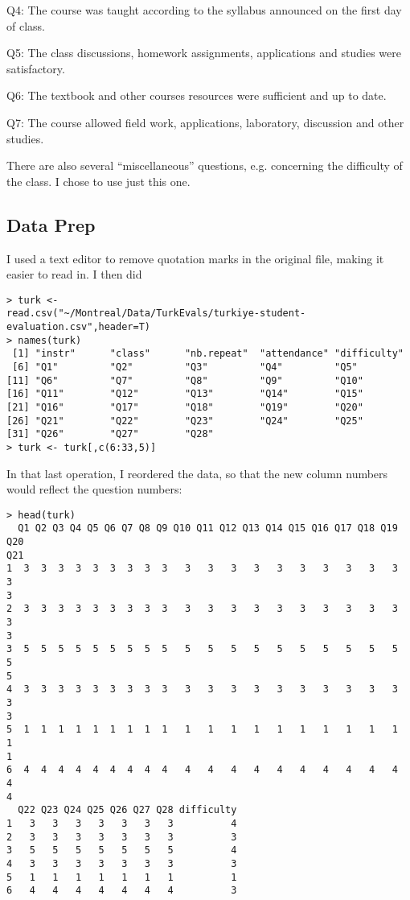 Q4: The course was taught according to the syllabus announced on the
first day of class.

Q5: The class discussions, homework assignments, applications and
studies were satisfactory.

Q6: The textbook and other courses resources were sufficient and up to
date.

Q7: The course allowed field work, applications, laboratory, discussion
and other studies.

There are also several ``miscellaneous'' questions, e.g. concerning the
difficulty of the class.  I chose to use just this one.

\subsection{Data Prep}

I used a text editor to remove quotation marks in the original file,
making it easier to read in.  I then did

\begin{lstlisting}
> turk <-
read.csv("~/Montreal/Data/TurkEvals/turkiye-student-evaluation.csv",header=T)
> names(turk)
 [1] "instr"      "class"      "nb.repeat"  "attendance" "difficulty"
 [6] "Q1"         "Q2"         "Q3"         "Q4"         "Q5"        
[11] "Q6"         "Q7"         "Q8"         "Q9"         "Q10"       
[16] "Q11"        "Q12"        "Q13"        "Q14"        "Q15"       
[21] "Q16"        "Q17"        "Q18"        "Q19"        "Q20"       
[26] "Q21"        "Q22"        "Q23"        "Q24"        "Q25"       
[31] "Q26"        "Q27"        "Q28"       
> turk <- turk[,c(6:33,5)]
\end{lstlisting}

In that last operation, I reordered the data, so that the new column
numbers would reflect the question numbers:

\begin{lstlisting}
> head(turk)
  Q1 Q2 Q3 Q4 Q5 Q6 Q7 Q8 Q9 Q10 Q11 Q12 Q13 Q14 Q15 Q16 Q17 Q18 Q19 Q20
Q21
1  3  3  3  3  3  3  3  3  3   3   3   3   3   3   3   3   3   3   3   3
3
2  3  3  3  3  3  3  3  3  3   3   3   3   3   3   3   3   3   3   3   3
3
3  5  5  5  5  5  5  5  5  5   5   5   5   5   5   5   5   5   5   5   5
5
4  3  3  3  3  3  3  3  3  3   3   3   3   3   3   3   3   3   3   3   3
3
5  1  1  1  1  1  1  1  1  1   1   1   1   1   1   1   1   1   1   1   1
1
6  4  4  4  4  4  4  4  4  4   4   4   4   4   4   4   4   4   4   4   4
4
  Q22 Q23 Q24 Q25 Q26 Q27 Q28 difficulty
1   3   3   3   3   3   3   3          4
2   3   3   3   3   3   3   3          3
3   5   5   5   5   5   5   5          4
4   3   3   3   3   3   3   3          3
5   1   1   1   1   1   1   1          1
6   4   4   4   4   4   4   4          3
\end{lstlisting}

